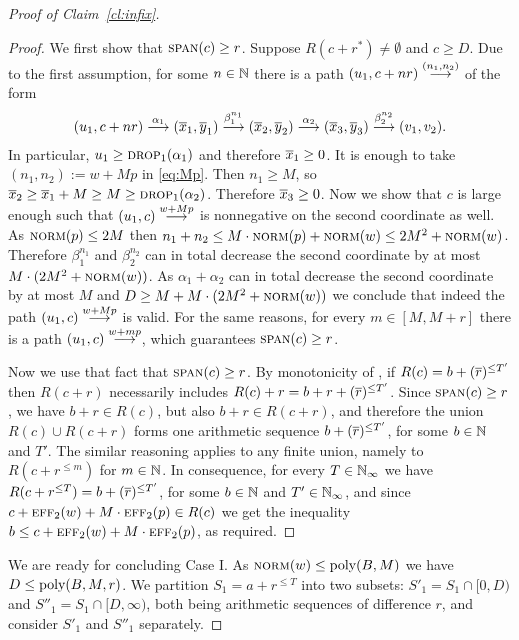 \begin{proof}[Proof of Claim~\ref{cl:infix}]
\begin{proof}
We first show that $\textsc{span}(c) \geq r$.
Suppose $R(c+r^*) \neq \emptyset$ and $c \geq D$.
Due to the first assumption,  for some $n\in\mathbb{N}$ there is a path $(u_1, c+nr) \stackrel{(n_1, n_2)}{\longrightarrow}$
of the form
\begin{align} \label{eq:Mp}
(u_1, c+nr) \stackrel{\alpha_1}{\longrightarrow} (\overline{x}_1, \overline{y}_1) \stackrel{\beta_1^{n_1}}{\longrightarrow} (\overline{x}_2, \overline{y}_2) \stackrel{\alpha_2}{\longrightarrow} (\overline{x}_3, \overline{y}_3) \stackrel{\beta_2^{n_2}}{\longrightarrow} (v_1, v_2).
\end{align}
In particular,  $u_1 \geq \textsc{drop}_1(\alpha_1)$
and therefore $\overline{x}_1\geq 0$.
It is enough to take $(n_1, n_2) := w + Mp$ in \eqref{eq:Mp}.
Then $n_1 \geq M$, so $\overline{x}_2 \geq \overline{x}_1 + M \geq M \geq \textsc{drop}_1(\alpha_2)$.
Therefore $\overline{x}_3\geq 0$.
Now we show that $c$ is large enough such that $(u_1, c) \stackrel{w+Mp}{\longrightarrow}$ is nonnegative on the second coordinate as well.
As $\textsc{norm}(p) \leq 2M$ then $n_1 + n_2 \leq M \cdot \textsc{norm}(p) + \textsc{norm}(w) \leq 2M^2 + \textsc{norm}(w)$. Therefore
$\beta_1^{n_1}$ and $\beta_2^{n_2}$ can in total decrease the second coordinate by at most $M \cdot (2M^2 + \textsc{norm}(w))$.
As $\alpha_1 + \alpha_2$ can in total decrease the second coordinate by at most $M$ and
$D \geq M + M \cdot (2M^2 + \textsc{norm}(w))$ we conclude that indeed the path $(u_1, c) \stackrel{w+Mp}{\longrightarrow}$ is valid.
For the same reasons, for every $m\in [M, M+r]$ there is a path $(u_1, c) \stackrel{w+mp}{\longrightarrow}$, which guarantees $\textsc{span}(c) \geq r$. 

Now we use that fact that $\textsc{span}(c) \geq r$.
By monotonicity of \vass, if $R(c) = b+(\overline{r})^{\leq {T'}}$
then $R(c+r)$ necessarily includes $R(c) + r= b+r+(\overline{r})^{\leq {T'}}$.
Since $\textsc{span}(c) \geq r$, we have $b+r \in R(c)$, but also $b+r \in R(c+r)$,
and therefore the union $R(c) \cup R(c + r)$ forms one arithmetic sequence 
$b+(\overline{r})^{\leq T'}$, for some $b\in\mathbb{N}$ and $T'$.
The similar reasoning applies to any finite union, namely to $R(c+r^{\leq m})$ for $m\in\mathbb{N}$.
In consequence, for every $T\in \mathbb{N}_\infty$ we have $R(c+r^{\leq T}) = b + (\overline{r})^{\leq T'}$,
for some $b\in\mathbb{N}$ and $T'\in \mathbb{N}_\infty$,
and since $c+ \textsc{eff}_2(w) + M \cdot \textsc{eff}_2(p) \in R(c)$ we get the inequality $b \leq c + \textsc{eff}_2(w) + M \cdot \textsc{eff}_2(p)$, as required.
\end{proof}

We are ready for concluding Case I.
As $\textsc{norm}(w) \leq \textup{poly}(B, M)$ we have $D \leq \textup{poly}(B, M, r)$.
We  partition $S_1 = a + r^{\leq T}$ into two subsets: $S'_1 = S_1 \cap [0,D)$
and $S''_1 = S_1 \cap [D,\infty)$, both being arithmetic sequences of difference $r$,
and consider $S'_1$ and $S''_1$ separately.
 

\end{proof}
